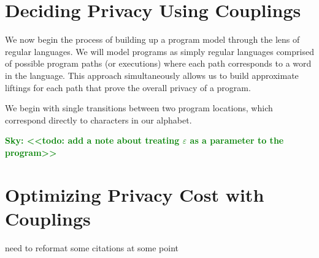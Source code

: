 \documentclass[12pt]{article}
\newcommand{\todo}[2]{\textcolor{#1}{\textbf{#2}}}
\newcommand{\sky}[1]{\todo{green}{Sky: <<#1>>}}
\theoremstyle{definition}
\begin{document}



\section{Deciding Privacy Using Couplings}

We now begin the process of building up a program model through the lens of regular languages. 
We will model programs as simply regular languages comprised of possible program paths (or executions) where each path corresponds to a word in the language. This approach simultaneously allows us to build approximate liftings for each path that prove the overall privacy of a program.

We begin with single transitions between two program locations, which correspond directly to characters in our alphabet. 

\sky{todo: add a note about treating $\varepsilon$ as a parameter to the program}











\section{Optimizing Privacy Cost with Couplings}







{\color{red} need to reformat some citations at some point}



\end{document}
